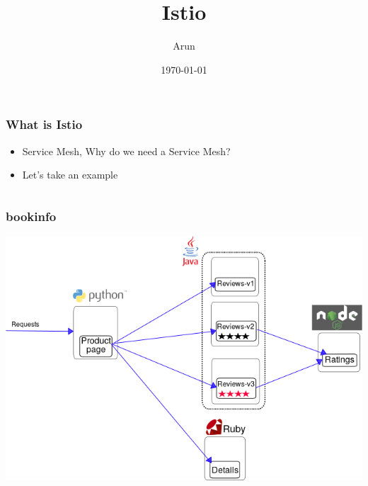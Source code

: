 \documentclass[12pt]{beamer}
\title{Istio}
\author{Arun}
\date{\today}
\begin{document}
        \begin{frame}
            \begin{center}
                \frametitle{What is Istio}
                \begin{itemize}
                    \pause
                    \item Service Mesh, Why do we need a Service Mesh?
                    \pause
                    \item Let's take an example
                \end{itemize}
            \end{center}
        \end{frame}

        \begin{frame}
            \begin{columns}
                    \begin{center}
                        \frametitle{bookinfo}
                        \includegraphics[width=1\textwidth]{images/bookinfo.png}
                    \end{center}


\end{columns}
\end{frame}
\end{document}
